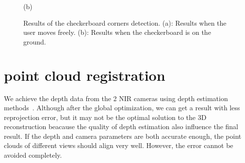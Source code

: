 \documentclass{article}
\begin{document}
\begin{figure}[ht]
\begin{minipage}[b]{0.48\linewidth}
  \vspace{0cm}
  \centerline{(b)}\medskip
\end{minipage}
%
\caption{Results of the checkerboard corners detection. (a): Results when the user moves freely. (b): Results when the checkerboard is on the ground. }
\label{fig:checkerboard}
\end{figure}
\section{point cloud registration}

We achieve the depth data from the 2 NIR cameras using depth estimation methods~\cite{Bleyer2011PatchMatch}. Although after the global optimization, we can get a result with less reprojection error, but it may not be the optimal solution to the 3D reconstruction beacause the quality of depth estimation also influence the final result. If the depth and camera parameters are both accurate enough, the point clouds of different views should align very well. However, the error cannot be avoided completely.
\end{document}
